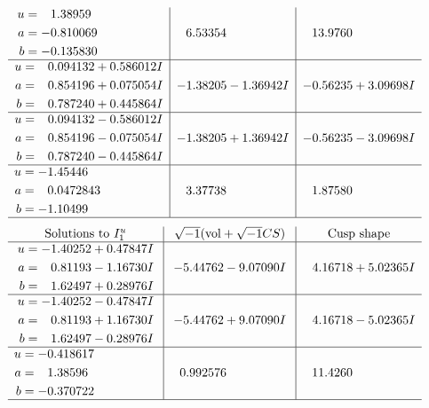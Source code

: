 \documentclass[1p]{elsarticle_modified}
\theoremstyle{definition}
\newcommand{\I}{\sqrt{-1}}
\begin{document}
$$\begin{array}{c|c|c}
\begin{aligned}
u &= \phantom{-}1.38959\phantom{ +0.000000I} \\
a &= -0.810069\phantom{ +0.000000I} \\
b &= -0.135830\phantom{ +0.000000I}\end{aligned}
 & \phantom{-}6.53354\phantom{ +0.000000I} & \phantom{-}13.9760\phantom{ +0.000000I} \\ \hline\begin{aligned}
u &= \phantom{-}0.094132 + 0.586012 I \\
a &= \phantom{-}0.854196 + 0.075054 I \\
b &= \phantom{-}0.787240 + 0.445864 I\end{aligned}
 & -1.38205 - 1.36942 I & -0.56235 + 3.09698 I \\ \hline\begin{aligned}
u &= \phantom{-}0.094132 - 0.586012 I \\
a &= \phantom{-}0.854196 - 0.075054 I \\
b &= \phantom{-}0.787240 - 0.445864 I\end{aligned}
 & -1.38205 + 1.36942 I & -0.56235 - 3.09698 I \\ \hline\begin{aligned}
u &= -1.45446\phantom{ +0.000000I} \\
a &= \phantom{-}0.0472843\phantom{ +0.000000I} \\
b &= -1.10499\phantom{ +0.000000I}\end{aligned}
 & \phantom{-}3.37738\phantom{ +0.000000I} & \phantom{-}1.87580\phantom{ +0.000000I}\\
 \hline 
 \end{array}$$\newpage$$\begin{array}{c|c|c}  
\text{Solutions to }I^u_{1}& \I (\text{vol} + \sqrt{-1}CS) & \text{Cusp shape}\\
 \hline 
\begin{aligned}
u &= -1.40252 + 0.47847 I \\
a &= \phantom{-}0.81193 - 1.16730 I \\
b &= \phantom{-}1.62497 + 0.28976 I\end{aligned}
 & -5.44762 - 9.07090 I & \phantom{-}4.16718 + 5.02365 I \\ \hline\begin{aligned}
u &= -1.40252 - 0.47847 I \\
a &= \phantom{-}0.81193 + 1.16730 I \\
b &= \phantom{-}1.62497 - 0.28976 I\end{aligned}
 & -5.44762 + 9.07090 I & \phantom{-}4.16718 - 5.02365 I \\ \hline\begin{aligned}
u &= -0.418617\phantom{ +0.000000I} \\
a &= \phantom{-}1.38596\phantom{ +0.000000I} \\
b &= -0.370722\phantom{ +0.000000I}\end{aligned}
 & \phantom{-}0.992576\phantom{ +0.000000I} & \phantom{-}11.4260\phantom{ +0.000000I}\\
 \hline 
 \end{array}$$\newpage\newpage\renewcommand{\arraystretch}{1}
\end{document}
